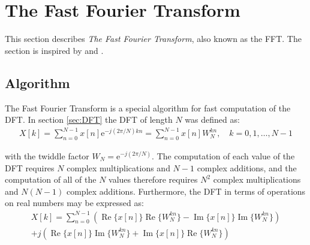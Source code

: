 \section{The Fast Fourier Transform} \label{sec:FFT}
This section describes \textit{The Fast Fourier Transform}, also known as the FFT. The section is inspired by \cite{pages 750, 755-763, DTSP} and \cite{page 303, FSP}.
\subsection{Algorithm}
The Fast Fourier Transform is a special algorithm for fast computation of the DFT. In section \ref{sec:DFT} the DFT of length $N$ was defined as:
\begin{align*}
X[k] = \sum_{n=0}^{N-1} x[n] \text{e}^{-j(2\pi/N)kn} = \sum_{n=0}^{N-1} x[n] W_N^{kn}, \quad k = 0, 1, \dots, N-1
\end{align*}

with the twiddle factor $W_N = \text{e}^{-j(2\pi/N)}$. The computation of each value of the DFT requires $N$ complex multiplications and $N-1$ complex additions, and the computation of all of the $N$ values therefore requires $N^2$ complex multiplications and $N(N-1)$ complex additions. Furthermore, the DFT in terms of operations on real numbers may be expressed as:
\begin{align*}
X[k] = \sum_{n=0}^{N-1} \left( \operatorname{Re}\{x[n]\} \operatorname{Re} \{W_N^{kn}\} - \operatorname{Im}\{x[n]\}\operatorname{Im} \{W_N^{kn}\} \right) \\ + j \left( \operatorname{Re} \{x[n]\}\operatorname{Im} \{W_N^{kn}\} + \operatorname{Im} \{x[n]\} \operatorname{Re}\{W_N^{kn}\}\right)
\end{align*}

